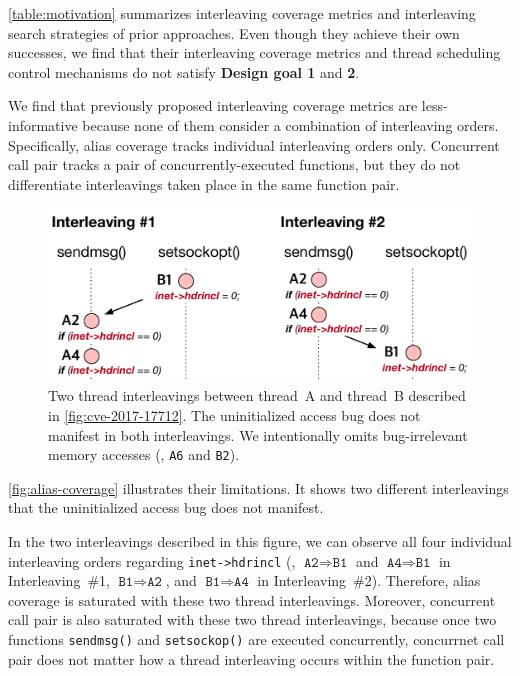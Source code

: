 \autoref{table:motivation} summarizes interleaving coverage metrics and 
interleaving search strategies of prior approaches.
%
Even though they achieve their own successes, we find that
their interleaving coverage metrics and thread scheduling control
mechanisms do not satisfy \textbf{Design goal 1} and \textbf{2}.


%
We find that previously proposed interleaving coverage metrics are
less-informative 
because none of them consider a combination of interleaving
orders. 
%
Specifically, alias coverage tracks individual interleaving orders only.
Concurrent call pair tracks a pair of
concurrently-executed functions, but they do not differentiate
interleavings taken place in the same function pair.




\begin{figure}[t]
  \centering
  \includegraphics[width=0.95\linewidth]{fig/alias-coverage.pdf}
  \caption{Two thread interleavings between thread~A and thread~B
    described in \autoref{fig:cve-2017-17712}. The uninitialized
    access bug does not manifest in both interleavings. We
    intentionally omits bug-irrelevant memory accesses (\ie,
    \texttt{A6} and \texttt{B2}).}
  \label{fig:alias-coverage}
\end{figure}


\autoref{fig:alias-coverage} illustrates their limitations.
It shows two different interleavings that the uninitialized access bug 
does not manifest. 

%
In the two interleavings described in this figure, we can observe all
four individual interleaving orders regarding \texttt{inet->hdrincl}
(\ie, $\texttt{A2} \Rightarrow \texttt{B1}$ and
$\texttt{A4} \Rightarrow \texttt{B1}$ in Interleaving~\#1,
$\texttt{B1} \Rightarrow \texttt{A2}$, and
$\texttt{B1} \Rightarrow \texttt{A4}$ in Interleaving~\#2).
%
Therefore, alias coverage is saturated with these two thread
interleavings.
%
Moreover, concurrent call pair is also saturated with these two thread
interleavings, because once two functions \texttt{sendmsg()} and
\texttt{setsockop()} are executed concurrently, concurrnet call pair
does not matter how a thread interleaving occurs within the function
pair.

